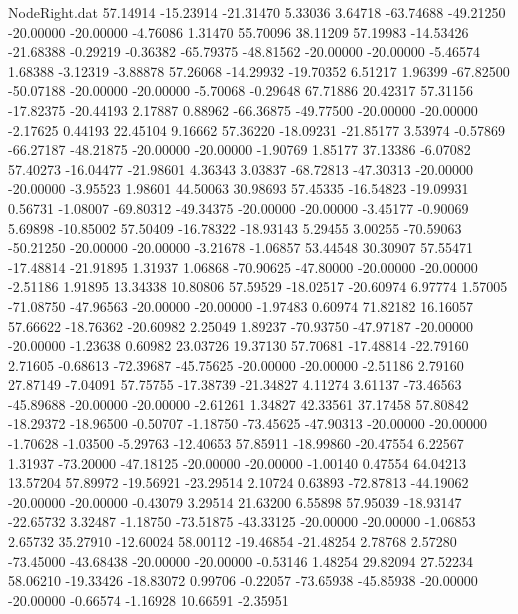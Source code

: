 \begin{filecontents}{NodeRight.dat}
  57.14914  -15.23914  -21.31470     5.33036    3.64718  -63.74688  -49.21250  -20.00000  -20.00000   -4.76086    1.31470   55.70096   38.11209
  57.19983  -14.53426  -21.68388    -0.29219   -0.36382  -65.79375  -48.81562  -20.00000  -20.00000   -5.46574    1.68388   -3.12319   -3.88878
  57.26068  -14.29932  -19.70352     6.51217    1.96399  -67.82500  -50.07188  -20.00000  -20.00000   -5.70068   -0.29648   67.71886   20.42317
  57.31156  -17.82375  -20.44193     2.17887    0.88962  -66.36875  -49.77500  -20.00000  -20.00000   -2.17625    0.44193   22.45104    9.16662
  57.36220  -18.09231  -21.85177     3.53974   -0.57869  -66.27187  -48.21875  -20.00000  -20.00000   -1.90769    1.85177   37.13386   -6.07082
  57.40273  -16.04477  -21.98601     4.36343    3.03837  -68.72813  -47.30313  -20.00000  -20.00000   -3.95523    1.98601   44.50063   30.98693
  57.45335  -16.54823  -19.09931     0.56731   -1.08007  -69.80312  -49.34375  -20.00000  -20.00000   -3.45177   -0.90069    5.69898  -10.85002
  57.50409  -16.78322  -18.93143     5.29455    3.00255  -70.59063  -50.21250  -20.00000  -20.00000   -3.21678   -1.06857   53.44548   30.30907
  57.55471  -17.48814  -21.91895     1.31937    1.06868  -70.90625  -47.80000  -20.00000  -20.00000   -2.51186    1.91895   13.34338   10.80806
  57.59529  -18.02517  -20.60974     6.97774    1.57005  -71.08750  -47.96563  -20.00000  -20.00000   -1.97483    0.60974   71.82182   16.16057
  57.66622  -18.76362  -20.60982     2.25049    1.89237  -70.93750  -47.97187  -20.00000  -20.00000   -1.23638    0.60982   23.03726   19.37130
  57.70681  -17.48814  -22.79160     2.71605   -0.68613  -72.39687  -45.75625  -20.00000  -20.00000   -2.51186    2.79160   27.87149   -7.04091
  57.75755  -17.38739  -21.34827     4.11274    3.61137  -73.46563  -45.89688  -20.00000  -20.00000   -2.61261    1.34827   42.33561   37.17458
  57.80842  -18.29372  -18.96500    -0.50707   -1.18750  -73.45625  -47.90313  -20.00000  -20.00000   -1.70628   -1.03500   -5.29763  -12.40653
  57.85911  -18.99860  -20.47554     6.22567    1.31937  -73.20000  -47.18125  -20.00000  -20.00000   -1.00140    0.47554   64.04213   13.57204
  57.89972  -19.56921  -23.29514     2.10724    0.63893  -72.87813  -44.19062  -20.00000  -20.00000   -0.43079    3.29514   21.63200    6.55898
  57.95039  -18.93147  -22.65732     3.32487   -1.18750  -73.51875  -43.33125  -20.00000  -20.00000   -1.06853    2.65732   35.27910  -12.60024
  58.00112  -19.46854  -21.48254     2.78768    2.57280  -73.45000  -43.68438  -20.00000  -20.00000   -0.53146    1.48254   29.82094   27.52234
  58.06210  -19.33426  -18.83072     0.99706   -0.22057  -73.65938  -45.85938  -20.00000  -20.00000   -0.66574   -1.16928   10.66591   -2.35951

\end{filecontents}
